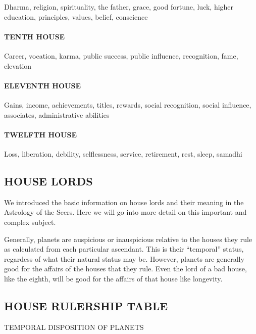 Dharma, religion, spirituality, the father, grace, good fortune, luck, higher education, principles, values, belief, conscience

\paragraph{TENTH HOUSE}

Career, vocation, karma, public success, public influence, recognition, fame, elevation

\paragraph{ELEVENTH HOUSE}

Gains, income, achievements, titles, rewards, social recognition, social influence, associates, administrative abilities

\paragraph{TWELFTH HOUSE}

Loss, liberation, debility, selflessness, service, retirement, rest, sleep, samadhi



 

\subsection{HOUSE LORDS}
 

We introduced the basic information on house lords and their meaning in the Astrology of the Seers. Here we will go into more detail on this important and complex subject.

 

Generally, planets are auspicious or inauspicious relative to the houses they rule as calculated from each particular ascendant. This is their “temporal” status, regardess of what their natural status may be.
However, planets are generally good for the affairs of the houses that they rule. Even the lord of a bad house, like the eighth, will be good for the affairs of that house like longevity.

\subsection{HOUSE RULERSHIP TABLE}
TEMPORAL DISPOSITION OF PLANETS
 
